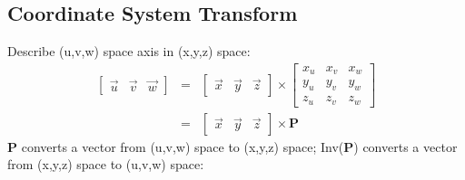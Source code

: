 \documentclass[12pt]{article}
\begin{document}
    \subsection{Coordinate System Transform}
        Describe (u,v,w) space axis in (x,y,z) space:
        \begin{eqnarray*}
            \left[ \begin{array}{ccc} \overrightarrow{u} & \overrightarrow{v} & \overrightarrow{w} \end{array} \right] &
            = &
            \left[ \begin{array}{ccc} \overrightarrow{x} & \overrightarrow{y} & \overrightarrow{z} \end{array} \right]
            \times
            \left[ \begin{array}{ccc}
                x_u & x_v & x_w \\
                y_u & y_v & y_w \\
                z_u & z_v & z_w
            \end{array} \right] \\
            & = &
            \left[ \begin{array}{ccc} \overrightarrow{x} & \overrightarrow{y} & \overrightarrow{z} \end{array} \right]
            \times
            \textbf{P}
        \end{eqnarray*}
        \textbf{P} converts a vector from (u,v,w) space to (x,y,z) space; Inv(\textbf{P})
        converts a vector from (x,y,z) space to (u,v,w) space:
\end{document}
